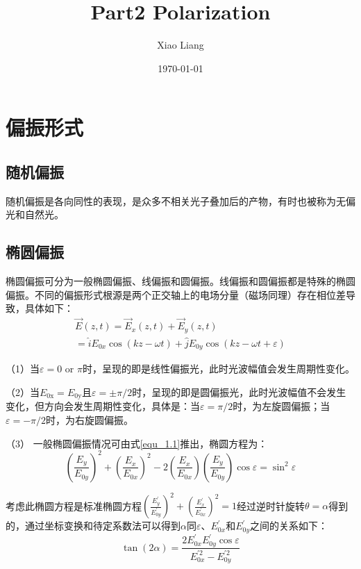 \documentclass[UTF8]{ctexart}
\title{Part2	Polarization}
\author{Xiao Liang}
\date{\today}
\newcommand{\backdoc}{\normalsize}
\begin{document}
	\maketitle
	\tableofcontents
	\section{偏振形式}
	\subsection{随机偏振}
	
	\normalsize
	随机偏振是各向同性的表现，是众多不相关光子叠加后的产物，有时也被称为无偏光和自然光。
	
	\subsection{椭圆偏振}
	
	\backdoc
	椭圆偏振可分为一般椭圆偏振、线偏振和圆偏振。线偏振和圆偏振都是特殊的椭圆偏振。不同的偏振形式根源是两个正交轴上的电场分量（磁场同理）存在相位差导致，具体如下：
	\begin{equation}
	\begin{array}{l}{\vec{E}(z, t)=\vec{E}_{x}(z, t)+\vec{E}_{y}(z, t)} \\ {=\hat{i} E_{0 x} \cos (k z-\omega t)+\hat{j} E_{0 y} \cos (k z-\omega t+\varepsilon)}\end{array}\label{equ_1.1}
	\end{equation}
	
	（1）当$\varepsilon=$0 or $\pi$时，呈现的即是线性偏振光，此时光波幅值会发生周期性变化。
	
	（2）当$E_{0 \mathrm{x}}=E_{0 \mathrm{y}}$且$\varepsilon=\pm\pi/2$时，呈现的即是圆偏振光，此时光波幅值不会发生变化，但方向会发生周期性变化，具体是：当$\varepsilon=\pi/2$时，为左旋圆偏振；当$\varepsilon=-\pi/2$时，为右旋圆偏振。
	
	（3） 一般椭圆偏振情况可由式\ref{equ_1.1}推出，椭圆方程为：
	\begin{equation}
	\left(\frac{E_{y}}{E_{0 y}}\right)^{2}+\left(\frac{E_{x}}{E_{0 x}}\right)^{2}-2\left(\frac{E_{x}}{E_{0 x}}\right)\left(\frac{E_{y}}{E_{0 y}}\right) \cos \varepsilon=\sin ^{2} \varepsilon
	\end{equation}
	
	考虑此椭圆方程是标准椭圆方程$\left(\frac{E_{y}^{\prime}}{E_{0 y}^{\prime}}\right)^{2}+\left(\frac{E_{x}^{\prime}}{E_{0 x}^{\prime}}\right)^{2}=1$经过逆时针旋转$\theta=\alpha$得到的，通过坐标变换和待定系数法可以得到$\alpha$同$\varepsilon$、$E_{0x}^{\prime}$和$E_{0y}^{\prime}$之间的关系如下：
	\begin{equation}
	\tan(2\alpha)=\frac{2E_{0x}^{\prime}E_{0y}^{\prime}\cos\varepsilon}{E_{0x}^{\prime 2}-E_{0y}^{\prime 2}}
	\end{equation}
	
\end{document}
